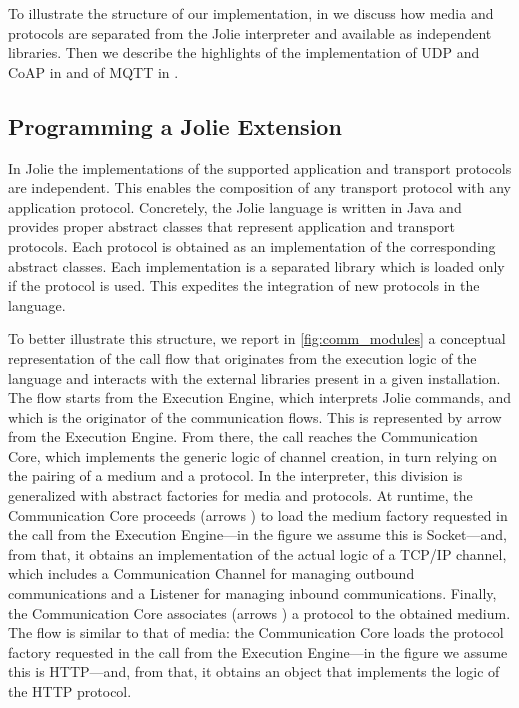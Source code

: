 To illustrate the structure of our implementation, in
 we discuss how media and protocols are separated
from the Jolie interpreter and available as independent libraries. Then we
describe the highlights of the implementation of UDP and CoAP in
 and of MQTT in .

\subsection{Programming a Jolie Extension}
\label{sub:jolie_extensions}

In Jolie the implementations of the supported application and transport
protocols are independent. This enables the composition of any transport
protocol with any application protocol. Concretely, the Jolie language is
written in Java and provides proper abstract classes that represent
application and transport protocols. Each protocol is obtained as an
implementation of the corresponding abstract classes. Each implementation is a
separated library which is loaded only if the protocol is used. This expedites
the integration of new protocols in the language.

To better illustrate this structure, we report in \cref{fig:comm_modules} a
conceptual representation of the call flow that originates from the execution
logic of the language and interacts with the external libraries present in a
given installation. The flow starts from the Execution Engine, which
interprets Jolie commands, and which is the originator of the communication
flows. This is represented by arrow  from the Execution Engine.
From there, the call reaches the Communication Core, which implements the
generic logic of channel creation, in turn relying on the pairing of a medium
and a protocol. In the interpreter, this division is generalized with abstract
factories for media and protocols. At runtime, the Communication Core proceeds
(arrows ) to load the medium factory requested in the call from the
Execution Engine---in the figure we assume this is Socket---and, from that, it
obtains an implementation of the actual logic of a TCP/IP channel, which
includes a Communication Channel for managing outbound communications and a
Listener for managing inbound communications. Finally, the Communication Core
associates (arrows
) a protocol to the obtained medium. The flow is similar to that of
media: the Communication Core loads the protocol factory requested in the call
from the Execution Engine---in the figure we assume this is HTTP---and, from
that, it obtains an object that implements the logic of the HTTP
protocol.

